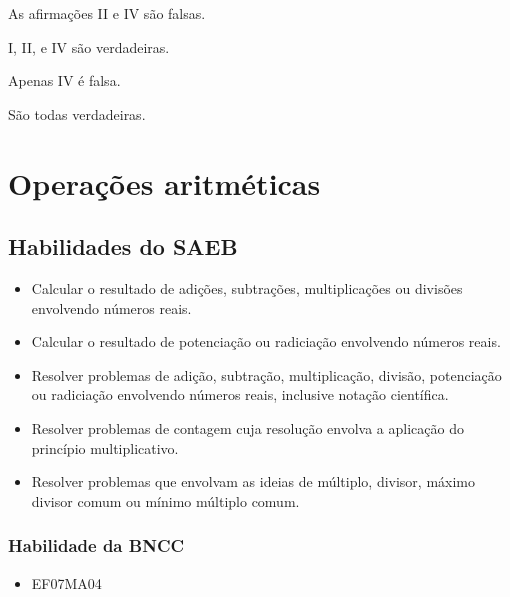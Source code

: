 \begin{escolha}
\item
  As afirmações II e IV são falsas.
\item
  I, II, e IV são verdadeiras.
\item
  Apenas IV é falsa.
\item
  São todas verdadeiras.
\end{escolha}



\chapter{Operações aritméticas}

\section{Habilidades do SAEB }

\begin{itemize}
\item Calcular o resultado de adições, subtrações,
multiplicações ou divisões envolvendo números reais.
\item
  Calcular o resultado de potenciação ou radiciação envolvendo números
  reais.
\item
  Resolver problemas de adição, subtração, multiplicação, divisão,
  potenciação ou radiciação envolvendo números reais, inclusive notação
  científica.
\item
  Resolver problemas de contagem cuja resolução envolva a aplicação do
  princípio multiplicativo.
\item
  Resolver problemas que envolvam as ideias de múltiplo, divisor, máximo
  divisor comum ou mínimo múltiplo comum.
\end{itemize}

\subsection{Habilidade da BNCC }
\begin{itemize}
\item EF07MA04
\end{itemize}

